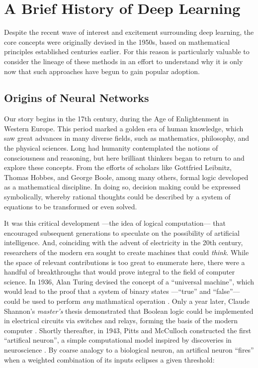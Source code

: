 \section{A Brief History of Deep Learning}

Despite the recent wave of interest and excitement surrounding deep learning, the core concepts were originally devised in the 1950s, based on mathematical principles established centuries earlier.
For this reason is particularly valuable to consider the lineage of these methods in an effort to understand why it is only now that such approaches have begun to gain popular adoption.

\subsection{Origins of Neural Networks}
\label{subsec:origins}

Our story begins in the 17th century, during the Age of Enlightenment in Western Europe.
This period marked a golden era of human knowledge, which saw great advances in many diverse fields, such as mathematics, philosophy, and the physical sciences.
Long had humanity contemplated the notions of consciousness and reasoning, but here brilliant thinkers began to return to and explore these concepts.
From the efforts of scholars like Gottfried Leibnitz, Thomas Hobbes, and George Boole, among many others, formal logic developed as a mathematical discipline.
In doing so, decision making could be expressed symbolically, whereby rational thoughts could be described by a system of equations to be transformed or even solved.

It was this critical development ---the idea of logical computation--- that encouraged subsequent generations to speculate on the possibility of artificial intelligence.
And, coinciding with the advent of electricity in the 20th century, researchers of the modern era sought to create machines that could \emph{think}.
While the space of relevant contributions is too great to enumerate here, there were a handful of breakthroughs that would prove integral to the field of computer science.
In 1936, Alan Turing devised the concept of a ``universal machine'', which would lead to the proof that a system of binary states ---``true'' and ``false''--- could be used to perform \emph{any} mathmatical operation \cite{}.
Only a year later, Claude Shannon's \emph{master's} thesis demonstrated that Boolean logic could be implemented in electrical circuits via switches and relays, forming the basis of the modern computer \cite{}.
Shortly thereafter, in 1943, Pitts and McCulloch constructed the first ``artifical neuron'', a simple computational model inspired by discoveries in neuroscience \cite{}.
By coarse analogy to a biological neuron, an artifical neuron ``fires'' when a weighted combination of its inputs eclipses a given threshold:

